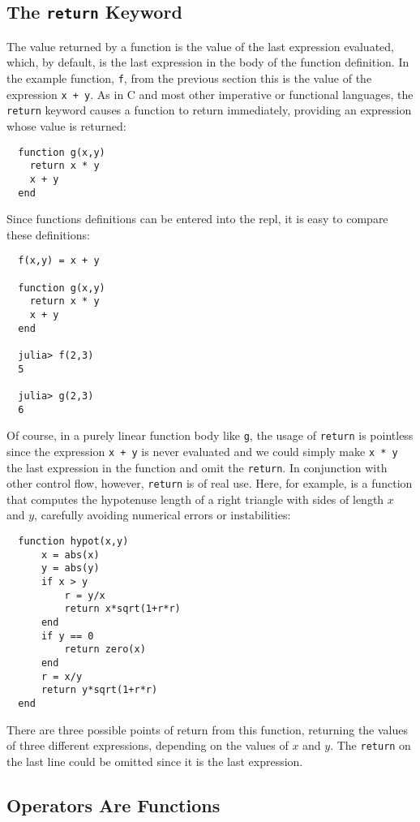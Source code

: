 \documentclass{article}
\renewcommand{\sec}[1]{\label{sec:#1}}
\begin{document}
\subsection{The \texttt{return} Keyword}\sec{the-return-keyword}

The value returned by a function is the value of the last expression evaluated, which, by default, is the last expression in the body of the function definition.
In the example function, \verb|f|, from the previous section this is the value of the expression \verb|x + y|.
As in C and most other imperative or functional languages, the \verb|return| keyword causes a function to return immediately, providing an expression whose value is returned: %
\begin{verbatim}
  function g(x,y)
    return x * y
    x + y
  end
\end{verbatim}
Since functions definitions can be entered into the repl, it is easy to compare these definitions:
\begin{verbatim}
  f(x,y) = x + y

  function g(x,y)
    return x * y
    x + y
  end

  julia> f(2,3)
  5

  julia> g(2,3)
  6
\end{verbatim}
Of course, in a purely linear function body like \verb|g|, the usage of \verb|return| is pointless since the expression \verb|x + y| is never evaluated and we could simply make \verb|x * y| the last expression in the function and omit the \verb|return|.
In conjunction with other control flow, however, \verb|return| is of real use.
Here, for example, is a function that computes the hypotenuse length of a right triangle with sides of length $x$ and $y$, carefully avoiding numerical errors or instabilities:
\begin{verbatim}
  function hypot(x,y)
      x = abs(x)
      y = abs(y)
      if x > y
          r = y/x
          return x*sqrt(1+r*r)
      end
      if y == 0
          return zero(x)
      end
      r = x/y
      return y*sqrt(1+r*r)
  end
\end{verbatim}
There are three possible points of return from this function, returning the values of three different expressions, depending on the values of $x$ and $y$.
The \verb|return| on the last line could be omitted since it is the last expression.

\subsection{Operators Are Functions}\sec{operators-are-functions}
\end{document}
